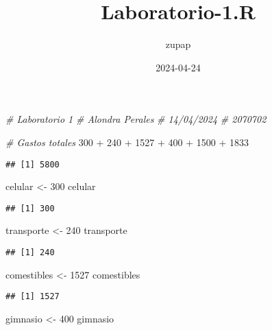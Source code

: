 \documentclass[
]{article}
\title{Laboratorio-1.R}
\author{zupap}
\date{2024-04-24}
\newenvironment{Shaded}{\begin{snugshade}}{\end{snugshade}}
\newcommand{\CommentTok}[1]{\textcolor[rgb]{0.56,0.35,0.01}{\textit{#1}}}
\newcommand{\DecValTok}[1]{\textcolor[rgb]{0.00,0.00,0.81}{#1}}
\newcommand{\NormalTok}[1]{#1}
\newcommand{\OtherTok}[1]{\textcolor[rgb]{0.56,0.35,0.01}{#1}}
\newcommand{\SpecialCharTok}[1]{\textcolor[rgb]{0.00,0.00,0.00}{#1}}
\begin{document}
\maketitle

\begin{Shaded}
\begin{Highlighting}[]
\CommentTok{\# Laboratorio 1}
\CommentTok{\# Alondra Perales}
\CommentTok{\# 14/04/2024}
\CommentTok{\# 2070702}

\CommentTok{\# Gastos totales}
\DecValTok{300} \SpecialCharTok{+} \DecValTok{240} \SpecialCharTok{+} \DecValTok{1527} \SpecialCharTok{+} \DecValTok{400} \SpecialCharTok{+} \DecValTok{1500} \SpecialCharTok{+} \DecValTok{1833}
\end{Highlighting}
\end{Shaded}

\begin{verbatim}
## [1] 5800
\end{verbatim}

\begin{Shaded}
\begin{Highlighting}[]
\NormalTok{celular }\OtherTok{\textless{}{-}} \DecValTok{300}
\NormalTok{celular}
\end{Highlighting}
\end{Shaded}

\begin{verbatim}
## [1] 300
\end{verbatim}

\begin{Shaded}
\begin{Highlighting}[]
\NormalTok{transporte }\OtherTok{\textless{}{-}} \DecValTok{240}
\NormalTok{transporte}
\end{Highlighting}
\end{Shaded}

\begin{verbatim}
## [1] 240
\end{verbatim}

\begin{Shaded}
\begin{Highlighting}[]
\NormalTok{comestibles }\OtherTok{\textless{}{-}} \DecValTok{1527}
\NormalTok{comestibles}
\end{Highlighting}
\end{Shaded}

\begin{verbatim}
## [1] 1527
\end{verbatim}

\begin{Shaded}
\begin{Highlighting}[]
\NormalTok{gimnasio }\OtherTok{\textless{}{-}} \DecValTok{400}
\NormalTok{gimnasio}
\end{Highlighting}
\end{Shaded}
\end{document}

